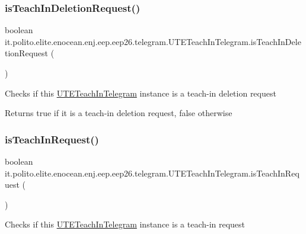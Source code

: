 \subsubsection{\texorpdfstring{is\+Teach\+In\+Deletion\+Request()}{isTeachInDeletionRequest()}}
{\footnotesize\ttfamily boolean it.\+polito.\+elite.\+enocean.\+enj.\+eep.\+eep26.\+telegram.\+U\+T\+E\+Teach\+In\+Telegram.\+is\+Teach\+In\+Deletion\+Request (\begin{DoxyParamCaption}{ }\end{DoxyParamCaption})}

Checks if this \hyperlink{classit_1_1polito_1_1elite_1_1enocean_1_1enj_1_1eep_1_1eep26_1_1telegram_1_1_u_t_e_teach_in_telegram}{U\+T\+E\+Teach\+In\+Telegram} instance is a teach-\/in deletion request

\begin{DoxyReturn}{Returns}
true if it is a teach-\/in deletion request, false otherwise 
\end{DoxyReturn}
\hypertarget{classit_1_1polito_1_1elite_1_1enocean_1_1enj_1_1eep_1_1eep26_1_1telegram_1_1_u_t_e_teach_in_telegram_ae01ee9c8d24b01e435ae98beb3d73677}{}\label{classit_1_1polito_1_1elite_1_1enocean_1_1enj_1_1eep_1_1eep26_1_1telegram_1_1_u_t_e_teach_in_telegram_ae01ee9c8d24b01e435ae98beb3d73677} 
\subsubsection{\texorpdfstring{is\+Teach\+In\+Request()}{isTeachInRequest()}}
{\footnotesize\ttfamily boolean it.\+polito.\+elite.\+enocean.\+enj.\+eep.\+eep26.\+telegram.\+U\+T\+E\+Teach\+In\+Telegram.\+is\+Teach\+In\+Request (\begin{DoxyParamCaption}{ }\end{DoxyParamCaption})}

Checks if this \hyperlink{classit_1_1polito_1_1elite_1_1enocean_1_1enj_1_1eep_1_1eep26_1_1telegram_1_1_u_t_e_teach_in_telegram}{U\+T\+E\+Teach\+In\+Telegram} instance is a teach-\/in request

